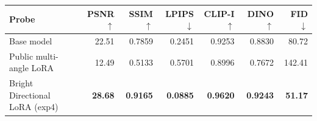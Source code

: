 \begin{tabular}{lrrrrrr}
\toprule
Probe & PSNR $\uparrow$ & SSIM $\uparrow$ & LPIPS $\downarrow$ & CLIP-I $\uparrow$ & DINO $\uparrow$ & FID $\downarrow$ \\
\midrule
Base model & 22.51 & 0.7859 & 0.2451 & 0.9253 & 0.8830 & 80.72 \\
Public multi-angle LoRA & 12.49 & 0.5133 & 0.5701 & 0.8996 & 0.7672 & 142.41 \\
Bright Directional LoRA (exp4) & \textbf{28.68} & \textbf{0.9165} & \textbf{0.0885} & \textbf{0.9620} & \textbf{0.9243} & \textbf{51.17} \\
\bottomrule
\end{tabular}
